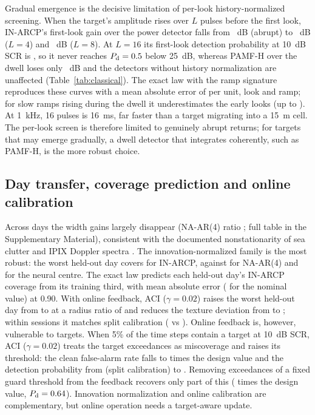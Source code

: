 \documentclass[journal]{IEEEtran}
\begin{document}
Gradual emergence is the decisive limitation of per-look history-normalized screening. When the target's amplitude rises over $L$ pulses before the first look, IN-ARCP's first-look gain over the power detector falls from \RampGainOne~dB (abrupt) to \RampGainFour~dB ($L=4$) and \RampGainEight~dB ($L=8$). At $L=16$ its first-look detection probability at 10~dB SCR is \RampPdSixteen, so it never reaches $P_{\rm d}=0.5$ below 25~dB, whereas PAMF-H over the dwell loses only \RampPAMFLoss~dB and the detectors without history normalization are unaffected (Table~\ref{tab:classical}). The exact law with the ramp signature reproduces these curves with a mean absolute error of \RampMae{} per unit, look and ramp; for slow ramps rising during the dwell it underestimates the early looks (up to \RampMaeWorst). At 1~kHz, 16 pulses is 16~ms, far faster than a target migrating into a 15~m cell. The per-look screen is therefore limited to genuinely abrupt returns; for targets that may emerge gradually, a dwell detector that integrates coherently, such as PAMF-H, is the more robust choice.

\subsection{Day transfer, coverage prediction and online calibration}
Across days the width gains largely disappear (NA-AR(4) ratio \TrRatioNAFour; full table in the Supplementary Material), consistent with the documented nonstationarity of sea clutter and IPIX Doppler spectra \cite{greco2010,rosenberg2017}. The innovation-normalized family is the most robust: the worst held-out day covers \TrWorstINOne{} for IN-ARCP, against \TrWorstNAFour{} for NA-AR(4) and \TrWorstMLP{} for the neural centre. The exact law predicts each held-out day's IN-ARCP coverage from its training third, with mean absolute error \CFiveMaeA{} (\CFiveNaiveA{} for the nominal value) at 0.90. With online feedback, ACI ($\gamma=0.02$) raises the worst held-out day from \ACIWorstSplit{} to \ACIWorst{} at a radius ratio of \ACIRadius{} and reduces the texture deviation from \ACIDevSplit{} to \ACIDev; within sessions it matches split calibration (\ACIWithin{} vs \ACIWithinSplit). Online feedback is, however, vulnerable to targets. When 5\% of the time steps contain a target at 10~dB SCR, ACI ($\gamma=0.02$) treats the target exceedances as miscoverage and raises its threshold: the clean false-alarm rate falls to \AciNaivePfa{} times the design value and the detection probability from \AciSplitPd{} (split calibration) to \AciNaivePd. Removing exceedances of a fixed guard threshold from the feedback recovers only part of this (\AciGatedPfa{} times the design value, $P_{\rm d}=0.64$). Innovation normalization and online calibration are complementary, but online operation needs a target-aware update.
\end{document}
